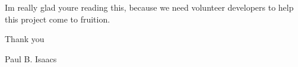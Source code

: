 I\textquotesingle{}m really glad you\textquotesingle{}re reading this, because we need volunteer developers to help this project come to fruition.

Thank you

Paul B. Isaac\textquotesingle{}s 